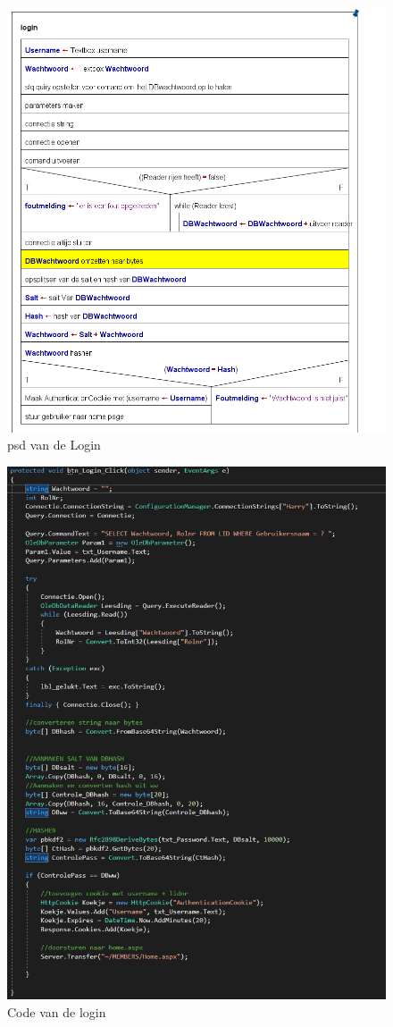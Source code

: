 \documentclass[11pt]{article}
\begin{document}
	\begin{figure}[h]
		\includegraphics[scale=0.4]{Login}
		\caption{psd van de Login}
		\label{Login}
	\end{figure}
	\newpage
	\begin{figure}[h]
		\includegraphics[scale=0.8]{CodeLogin}
		\caption{Code van de login}
		\label{LoginCode}
	\end{figure}
	\newpage
	
\end{document}
